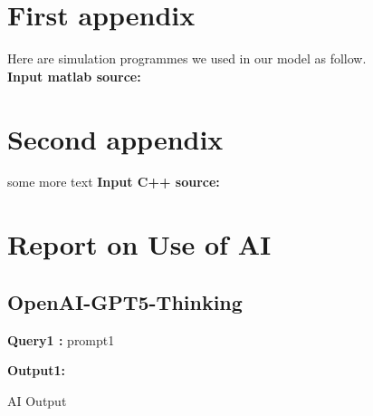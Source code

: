 ﻿\documentclass{mcmthesis}
\begin{document}
\begin{appendices}


\section{First appendix}

\lipsum[13]

Here are simulation programmes we used in our model as follow.\\

\textbf{\textcolor[rgb]{0.98,0.00,0.00}{Input matlab source:}}


\section{Second appendix}

some more text \textcolor[rgb]{0.98,0.00,0.00}{\textbf{Input C++ source:}}


\end{appendices}
\newpage

\section*{\centering Report on Use of AI}
\subsection*{OpenAI-GPT5-Thinking}
\textbf{Query1 :} prompt1  \par
\textbf{Output1:}
\begin{mdframed}[
    linewidth=2pt,        %
    linecolor=black,        %
    innertopmargin=10pt,    %
    innerbottommargin=10pt, %
    innerleftmargin=10pt,   %
    innerrightmargin=10pt,  %
    skipabove=5pt,         %
    skipbelow=5pt,          %
    backgroundcolor=gray!20
]
AI Output
\end{mdframed}
\end{document}
